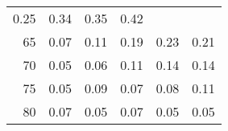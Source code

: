 \documentclass{article}
\begin{document}
\begin{table}[!h]
\begin{tabular}{llllll}
  \multicolumn{1}{r}{0.25} &
  \multicolumn{1}{r}{0.34} &
  \multicolumn{1}{r}{0.35} &
  \multicolumn{1}{r}{0.42} \\
\multicolumn{1}{r}{65\hspace{1em}} &
  \multicolumn{1}{|r}{0.07} &
  \multicolumn{1}{r}{0.11} &
  \multicolumn{1}{r}{0.19} &
  \multicolumn{1}{r}{0.23} &
  \multicolumn{1}{r}{0.21} \\
\multicolumn{1}{r}{70\hspace{1em}} &
  \multicolumn{1}{|r}{0.05} &
  \multicolumn{1}{r}{0.06} &
  \multicolumn{1}{r}{0.11} &
  \multicolumn{1}{r}{0.14} &
  \multicolumn{1}{r}{0.14} \\
\multicolumn{1}{r}{75\hspace{1em}} &
  \multicolumn{1}{|r}{0.05} &
  \multicolumn{1}{r}{0.09} &
  \multicolumn{1}{r}{0.07} &
  \multicolumn{1}{r}{0.08} &
  \multicolumn{1}{r}{0.11} \\
\multicolumn{1}{r}{80\hspace{1em}} &
  \multicolumn{1}{|r}{0.07} &
  \multicolumn{1}{r}{0.05} &
  \multicolumn{1}{r}{0.07} &
  \multicolumn{1}{r}{0.05} &
  \multicolumn{1}{r}{0.05} \\
\cline{1-6}
\end{tabular}
\end{table}
\end{document}
